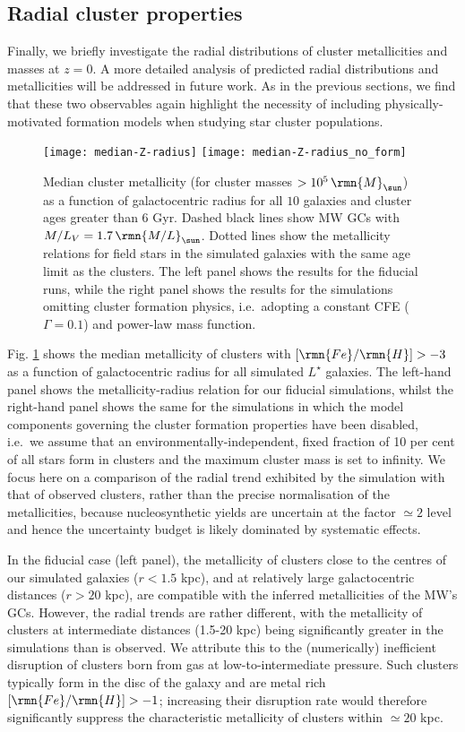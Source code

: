\documentclass[fleqn,usenatbib]{mnras}
\newcommand\Msun{\,\rmn{M}_{\sun}}
\newcommand\FeH{\lbrack \rmn{Fe}/\rmn{H} \rbrack}
\newcommand{\numgal}{10}
\begin{document}
\subsection{Radial cluster properties}

Finally, we briefly investigate the radial distributions of cluster metallicities and masses at $z=0$. A more detailed analysis of predicted radial distributions and metallicities will be addressed in future work. As in the previous sections, we find that these two observables again highlight the necessity of including physically-motivated formation models when studying star cluster populations.

\begin{figure*}
  \texttt{[image: median-Z-radius]}
  \texttt{[image: median-Z-radius\_no\_form]}
  \caption{Median cluster metallicity (for cluster masses $>10^{5} \Msun$) as a function of galactocentric radius for all $\numgal$ galaxies and cluster ages greater than 6 Gyr. Dashed black lines show MW GCs \citep{Harris_96} with $M/L_V = 1.7 \, \rmn{M/L}_{\sun}$. Dotted lines show the metallicity relations for field stars in the simulated galaxies with the same age limit as the clusters. The left panel shows the results for the fiducial runs, while the right panel shows the results for the simulations omitting cluster formation physics, i.e.~adopting a constant CFE ($\Gamma=0.1$) and power-law mass function. }
  \label{fig:radial-props}
\end{figure*}

Fig. \ref{fig:radial-props} shows the median metallicity of clusters with $\FeH > -3$ as a function of galactocentric radius for all simulated $L^\star$ galaxies. The left-hand panel shows the metallicity-radius relation for our fiducial simulations, whilst the right-hand panel shows the same for the simulations in which the model components governing the cluster formation properties have been disabled, i.e.~we assume that an environmentally-independent, fixed fraction of 10 per cent of all stars form in clusters and the maximum cluster mass is set to infinity. We focus here on a comparison of the radial trend exhibited by the simulation with that of observed clusters, rather than the precise normalisation of the metallicities, because nucleosynthetic yields are uncertain at the factor $\simeq 2$ level \citep[see e.g.][]{Wiersma_et_al_09} and hence the uncertainty budget is likely dominated by systematic effects.

In the fiducial case (left panel), the metallicity of clusters close to the centres of our simulated galaxies ($r < 1.5$ kpc), and at relatively large galactocentric distances ($r >20$ kpc), are compatible with the inferred metallicities of the MW's GCs. However, the radial trends are rather different, with the metallicity of clusters at intermediate distances (1.5-20 kpc) being significantly greater in the simulations than is observed. We attribute this to the (numerically) inefficient disruption of clusters born from gas at low-to-intermediate pressure. Such clusters typically form in the disc of the galaxy and are metal rich $\FeH > -1$; increasing their disruption rate would therefore significantly suppress the characteristic metallicity of clusters within $\simeq 20$ kpc.
\end{document}
